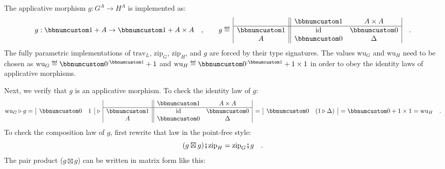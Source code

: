 The applicative morphism $g:G^{A}\rightarrow H^{A}$ is implemented
as:
\[
g:\bbnum 1+A\rightarrow\bbnum 1+A\times A\quad,\quad\quad g\triangleq\,\begin{array}{|c||cc|}
 & \bbnum 1 & A\times A\\
\hline \bbnum 1 & \text{id} & \bbnum 0\\
A & \bbnum 0 & \Delta
\end{array}\quad.
\]
The fully parametric implementations of $\text{trav}_{L}$, $\text{zip}_{G}$,
$\text{zip}_{H}$, and $g$ are forced by their type signatures. The
values $\text{wu}_{G}$ and $\text{wu}_{H}$ need to be chosen as
$\text{wu}_{G}\triangleq\bbnum 0^{:\bbnum 1}+1$ and $\text{wu}_{H}\triangleq\bbnum 0^{:\bbnum 1}+1\times1$
in order to obey the identity laws of applicative morphisms.

Next, we verify that $g$ is an applicative morphism. To check the
identity law of $g$:
\[
\text{wu}_{G}\triangleright g=\,\begin{array}{|cc|}
\bbnum 0 & 1\end{array}\,\triangleright\,\begin{array}{|c||cc|}
 & \bbnum 1 & A\times A\\
\hline \bbnum 1 & \text{id} & \bbnum 0\\
A & \bbnum 0 & \Delta
\end{array}\,=\,\begin{array}{|cc|}
\bbnum 0 & (1\triangleright\Delta)\end{array}\,=\bbnum 0+1\times1=\text{wu}_{H}\quad.
\]
To check the composition law of $g$, first rewrite that law in the
point-free style:
\begin{equation}
(g\boxtimes g)\bef\text{zip}_{H}=\text{zip}_{G}\bef g\quad.\label{eq:composition-law-applicative-morphism-point-free}
\end{equation}
The pair product ($g\boxtimes g$) can be written in matrix form like
this:
